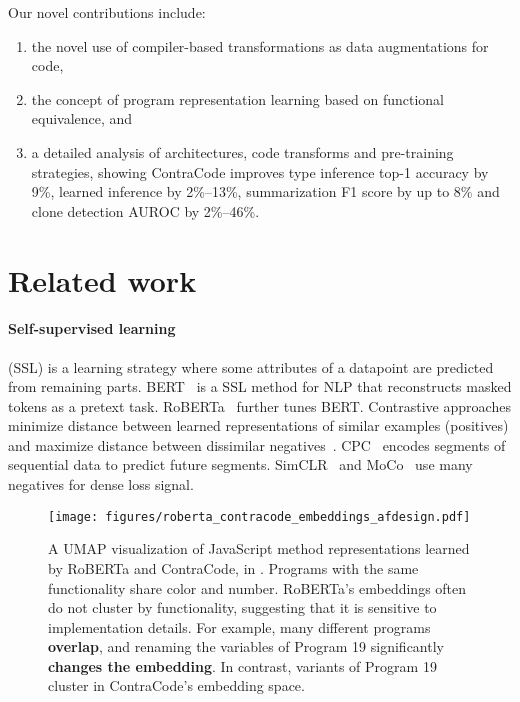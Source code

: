 \documentclass[11pt]{article}
\newcommand{\ours}[0]{ContraCode}
\begin{document}
Our novel contributions include:
\begin{enumerate}
    \item the novel use of compiler-based transformations as data augmentations for code,
    \item the concept of program representation learning based on functional equivalence, and
    \item a detailed analysis of architectures, code transforms and pre-training strategies, showing \ours{} improves type inference top-1 accuracy by 9\%, learned inference by 2\%--13\%, summarization F1 score by up to 8\% and clone detection AUROC by 2\%--46\%.
\end{enumerate}

\section{Related work}
\paragraph{Self-supervised learning} (SSL) is a learning strategy where some attributes of a datapoint are predicted from remaining parts.
BERT~\cite{devlin2018bert} is a SSL method for NLP that reconstructs masked tokens as a pretext task. RoBERTa~\cite{liu2019roberta} further tunes BERT. Contrastive approaches minimize distance between learned representations of similar examples (positives) and maximize distance between dissimilar negatives~\citep{hadsell2006dimensionality}.
CPC~\citep{cpcv1_oord2018representation, henaff2019data} encodes segments of sequential data to predict future segments. SimCLR~\citep{chen2020simple} and MoCo~\citep{he2019momentum, chen2020improved} use many negatives for dense loss signal.

\begin{figure}[t]
    \centering
    \texttt{[image: figures/roberta\_contracode\_embeddings\_afdesign.pdf]}
    \caption{A UMAP visualization of JavaScript method representations learned by RoBERTa and \ours{}, in . Programs with the same functionality share color and number. RoBERTa's embeddings often do not cluster by functionality, suggesting that it is sensitive to implementation details. For example, many different programs {\color[HTML]{7030A0}\textbf{overlap}}, and renaming the variables of Program 19 significantly {\color[HTML]{C00000}\textbf{changes the embedding}}. In contrast, variants of Program 19 cluster in \ours{}'s embedding space.}
    \label{fig:bert_motivation_tsne}
\end{figure}
\end{document}
